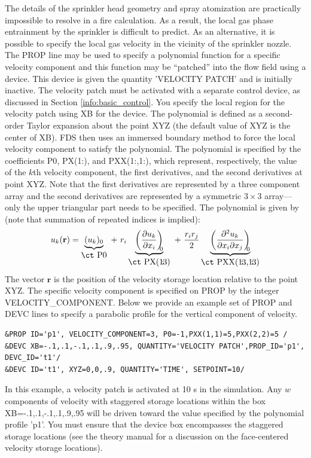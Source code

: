 \documentclass[11pt]{book}
\begin{document}
The details of the sprinkler head geometry and spray atomization are practically impossible to resolve in a fire calculation.  As a result, the local gas phase entrainment by the sprinkler is difficult to predict.  As an alternative, it is possible to specify the local gas velocity in the vicinity of the sprinkler nozzle.  The {\ct PROP} line may be used to specify a polynomial function for a specific velocity component and this function may be ``patched'' into the flow field using a device.  This device is given the quantity {\ct 'VELOCITY PATCH'} and is initially inactive.  The velocity patch must be activated with a separate control device, as discussed in Section \ref{info:basic_control}.  You specify the local region for the velocity patch using {\ct XB} for the device.  The polynomial is defined as a second-order Taylor expansion about the point {\ct XYZ} (the default value of {\ct XYZ} is the center of {\ct XB}).  FDS then uses an immersed boundary method to force the local velocity component to satisfy the polynomial.  The polynomial is specified by the coefficients {\ct P0}, {\ct PX(1\!:)}, and {\ct PXX(1\!:,1\!:)}, which represent, respectively, the value of the $k$th velocity component, the first derivatives, and the second derivatives at point {\ct XYZ}.  Note that the first derivatives are represented by a three component array and the second derivatives are represented by a symmetric $3 \times 3$ array---only the upper triangular part needs to be specified.  The polynomial is given by (note that summation of repeated indices is implied):
\begin{equation}
u_k(\mathbf{r}) = \underbrace{(u_k)_0}_{\mbox{\ct P0}} \,\,+\,\, r_i \underbrace{\left( \frac{\partial u_k}{\partial x_i} \right)_{\!\!\!0}}_{\mbox{\ct PX(1\!:\!3)}} \,\,+\,\,\frac{ r_i r_j}{2} \underbrace{\left(\frac{\partial^2 u_k}{\partial x_i \partial x_j}\right)_{\!\!\!0}}_{\mbox{\ct PXX(1\!:\!3,1\!:\!3)}}
\end{equation}
The vector $\mathbf{r}$ is the position of the velocity storage location relative to the point {\ct XYZ}.  The specific velocity component is specified on {\ct PROP} by the integer {\ct VELOCITY\_COMPONENT}.  Below we provide an example set of {\ct PROP} and {\ct DEVC} lines to specify a parabolic profile for the vertical component of velocity.
\begin{lstlisting}
&PROP ID='p1', VELOCITY_COMPONENT=3, P0=-1,PXX(1,1)=5,PXX(2,2)=5 /
&DEVC XB=-.1,.1,-.1,.1,.9,.95, QUANTITY='VELOCITY PATCH',PROP_ID='p1', DEVC_ID='t1'/
&DEVC ID='t1', XYZ=0,0,.9, QUANTITY='TIME', SETPOINT=10/
\end{lstlisting}
In this example, a velocity patch is activated at 10 s in the simulation.  Any $w$ components of velocity with staggered storage locations within the box {\ct XB=-.1,.1,-.1,.1,.9,.95} will be driven toward the value specified by the polynomial profile {\ct 'p1'}.  You must ensure that the device box encompasses the staggered storage locations (see the theory manual \cite{FDS_Math_Guide} for a discussion on the face-centered velocity storage locations).
\end{document}
